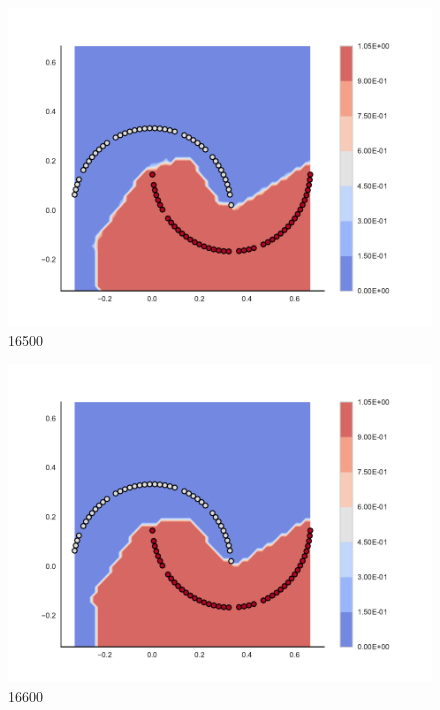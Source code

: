 \begin{subfigure}[b]{0.09\textwidth}
    \includegraphics[clip, trim=2.35cm 1.75cm 4.5cm 0cm,width=\textwidth]{img/convergence/16500.pdf}
    \caption{16500}
    \label{fig:convergence_16500}
\end{subfigure}
%
\begin{subfigure}[b]{0.09\textwidth}
    \includegraphics[clip, trim=2.35cm 1.75cm 4.5cm 0cm,width=\textwidth]{img/convergence/16600.pdf}
    \caption{16600}
    \label{fig:convergence_16600}
\end{subfigure}
%
